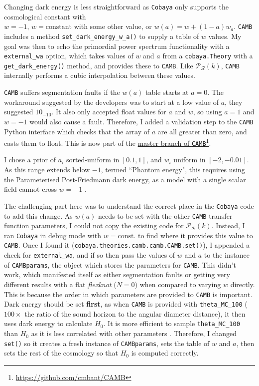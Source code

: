 \documentclass{article}
\begin{document}
Changing dark energy is less straightforward as \texttt{Cobaya} only supports the cosmological constant with \\ $w=-1$, $w = \textrm{constant}$ with some other value, or $w(a) = w+(1-a)w_a$. \texttt{CAMB} includes a method \texttt{set\_dark\_energy\_w\_a()} to supply a table of $w$ values. My goal was then to echo the primordial power spectrum functionality with a \texttt{external\_wa} option, which takes values of $w$ and $a$ from a \texttt{cobaya.Theory} with a \texttt{get\_dark\_energy()} method, and provides these to \texttt{CAMB}. Like $\mathcal P_\mathcal R(k)$, \texttt{CAMB} internally performs a cubic interpolation between these values.

\texttt{CAMB} suffers segmentation faults if the $w(a)$ table starts at $a=0$. The workaround suggested by the developers was to start at a low value of $a$, they suggested $10_{-10}$. It also only accepted float values for $a$ and $w$, so using $a=1$ and $w=-1$ would also cause a fault. Therefore, I added a validation step to the \texttt{CAMB} Python interface which checks that the array of $a$ are all greater than zero, and casts them to float. This is now part of the \href{https://github.com/cmbant/CAMB}{master branch of \texttt{CAMB}}\footnote{\href{https://github.com/cmbant/CAMB}{https://github.com/cmbant/CAMB}}.

I chose a prior of $a_i$ sorted-uniform in $[0.1, 1]$, and $w_i$ uniform in $[-2, -0.01]$. As this range extends below $-1$, termed ``Phantom energy", this requires using the Parameterised Post-Friedmann dark energy, as a model with a single scalar field cannot cross $w=-1$ \cite{PPF}. 

The challenging part here was to understand the correct place in the \texttt{Cobaya} code to add this change. As $w(a)$ needs to be set with the other \texttt{CAMB} transfer function parameters, I could not copy the existing code for $\mathcal P_\mathcal R(k)$. Instead, I ran \texttt{Cobaya} in debug mode with $w=\textrm{const.}$ to find where it provides this value to \texttt{CAMB}. Once I found it (\texttt{cobaya.theories.camb.camb.CAMB.set()}), I appended a check for \texttt{external\_wa}, and if so then pass the values of $w$ and $a$ to the instance of \texttt{CAMBparams}, the object which stores the parameters for \texttt{CAMB}. This didn't work, which manifested itself as either segmentation faults or getting very different results with a flat \textit{flexknot} ($N=0$) when compared to varying $w$ directly. This is because the order in which parameters are provided to \texttt{CAMB} is important. Dark energy should be set \textbf{first}, as when \texttt{CAMB} is provided with \texttt{theta\_MC\_100} ($100 \times$ the ratio of the sound horizon to the angular diameter distance), it then uses dark energy to calculate $H_0$. It is more efficient to sample \texttt{theta\_MC\_100} than $H_0$ as it is less correlated with other parameters \cite{CosmoMCReadMe}. Therefore, I changed \texttt{set()} so it creates a fresh instance of \texttt{CAMBparams}, sets the table of $w$ and $a$, then sets the rest of the cosmology so that $H_0$ is computed correctly.
\end{document}
